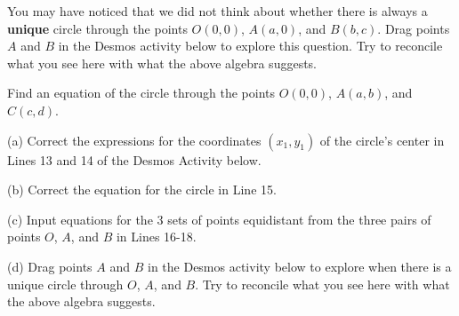 \documentclass{ximera}
\begin{document}
\begin{exploration}\label{exp:circle7}
You may have noticed that we did not think about whether there is always a {\bf unique} circle through the points $O(0,0)$, $A(a,0)$, and $B(b,c)$. Drag points $A$ and $B$ in the Desmos activity below to explore this question. Try to reconcile what you see here with what the above algebra suggests.
 
 
\begin{onlineOnly}
    \begin{center}
\end{center}
\end{onlineOnly}
\end{exploration}



\begin{example}  \label{Ex8}
Find an equation of the circle through the points $O(0,0)$, $A(a,b)$, and $C(c,d)$.

\begin{exploration}\label{exp:circle8}
(a) Correct the expressions for the coordinates $(x_1,y_1)$ of the circle's center in Lines 13 and 14 of the Desmos Activity below.

(b) Correct the equation for the circle in Line 15.

(c) Input equations for the 3 sets of points equidistant from the three pairs of points $O$, $A$, and $B$ in Lines 16-18.

(d)  Drag points $A$ and $B$ in the Desmos activity below to explore when there is a unique circle through $O$, $A$, and $B$. Try to reconcile what you see here with what the above algebra suggests.

 
 
\begin{onlineOnly}
    \begin{center}
\end{center}
\end{onlineOnly}
\end{exploration}

\end{example}
\end{document}
